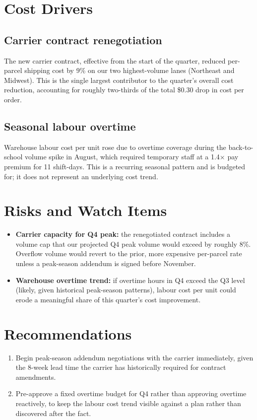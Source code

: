 \documentclass[11pt,a4paper]{article}
\begin{document}
\section{Cost Drivers}

\subsection{Carrier contract renegotiation}

The new carrier contract, effective from the start of the quarter,
reduced per-parcel shipping cost by 9\% on our two highest-volume
lanes (Northeast and Midwest). This is the single largest
contributor to the quarter's overall cost reduction, accounting for
roughly two-thirds of the total \$0.30 drop in cost per order.

\subsection{Seasonal labour overtime}

Warehouse labour cost per unit rose due to overtime coverage during
the back-to-school volume spike in August, which required temporary
staff at a 1.4$\times$ pay premium for 11 shift-days. This is a
recurring seasonal pattern and is budgeted for; it does not
represent an underlying cost trend.

\section{Risks and Watch Items}

\begin{itemize}[leftmargin=1.4em]
    \item \textbf{Carrier capacity for Q4 peak:} the renegotiated
    contract includes a volume cap that our projected Q4 peak volume
    would exceed by roughly 8\%. Overflow volume would revert to the
    prior, more expensive per-parcel rate unless a peak-season
    addendum is signed before November.
    \item \textbf{Warehouse overtime trend:} if overtime hours in Q4
    exceed the Q3 level (likely, given historical peak-season
    patterns), labour cost per unit could erode a meaningful share of
    this quarter's cost improvement.
\end{itemize}

\section{Recommendations}

\begin{enumerate}[leftmargin=1.4em]
    \item Begin peak-season addendum negotiations with the carrier
    immediately, given the 8-week lead time the carrier has
    historically required for contract amendments.
    \item Pre-approve a fixed overtime budget for Q4 rather than
    approving overtime reactively, to keep the labour cost trend
    visible against a plan rather than discovered after the fact.
\end{enumerate}
\end{document}
